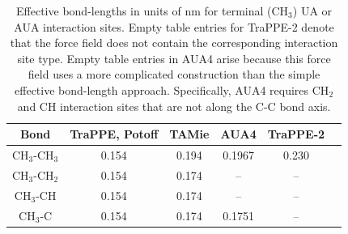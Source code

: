 \documentclass[preprint,review,12pt]{elsarticle}
\begin{document}
	\begin{table}[h!]
		\caption{Effective bond-lengths in units of nm for terminal (CH$_3$) UA or AUA interaction sites. Empty table entries for TraPPE-2 denote that the force field does not contain the corresponding interaction site type. Empty table entries in AUA4 arise because this force field uses a more complicated construction than the simple effective bond-length approach. Specifically, AUA4 requires CH$_2$ and CH interaction sites that are not along the C-C bond axis.} \label{tab:bond-lengths}
		\begin{center}
			\begin{tabular}{|c|c|c|c|c|c|}
				\hline
				Bond & TraPPE, Potoff & TAMie & AUA4 & TraPPE-2 \\ \hline
				CH$_3$-CH$_3$ & 0.154 & 0.194 & 0.1967 & 0.230 \\ 
				CH$_3$-CH$_2$ & 0.154 & 0.174 & -- & -- \\ 
				CH$_3$-CH & 0.154 & 0.174 & -- & -- \\
				CH$_3$-C & 0.154 & 0.174 & 0.1751 & -- \\
				\hline
			\end{tabular}
		\end{center} 
	\end{table}
	
\end{document}
